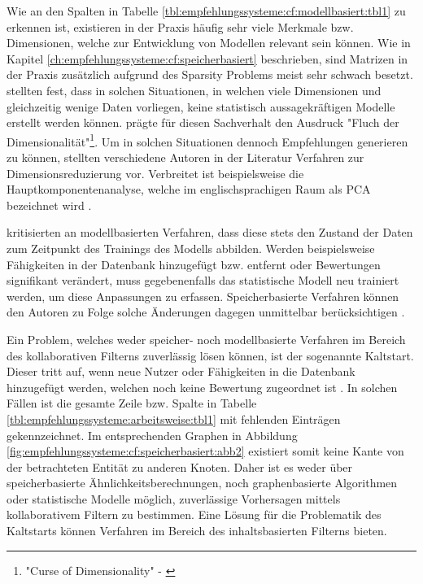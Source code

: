 Wie an den Spalten in Tabelle \ref{tbl:empfehlungssysteme:cf:modellbasiert:tbl1} zu erkennen ist, existieren in der Praxis häufig sehr viele Merkmale bzw. Dimensionen, welche zur Entwicklung von Modellen relevant sein können. Wie in Kapitel \ref{ch:empfehlungssysteme:cf:speicherbasiert} beschrieben, sind Matrizen in der Praxis zusätzlich aufgrund des Sparsity Problems meist sehr schwach besetzt. \textcite[S. 1]{boratto:2014} stellten fest, dass in solchen Situationen, in welchen viele Dimensionen und gleichzeitig wenige Daten vorliegen, keine statistisch aussagekräftigen Modelle erstellt werden können. \textcite[S. 94, Z. 7]{bellman:1961} prägte für diesen Sachverhalt den Ausdruck "Fluch der Dimensionalität"\footnote{"Curse of Dimensionality" - \textcite[S. 94, Z. 7]{bellman:1961}}. Um in solchen Situationen dennoch Empfehlungen generieren zu können, stellten verschiedene Autoren in der Literatur Verfahren zur Dimensionsreduzierung vor. Verbreitet ist beispielsweise die Hauptkomponentenanalyse, welche im englischsprachigen Raum als \ac{PCA} bezeichnet wird \cite[S. 1ff.]{vaswani:2018}.

\textcite[S. 1f.]{pennock:2000} kritisierten an modellbasierten Verfahren, dass diese stets den Zustand der Daten zum Zeitpunkt des Trainings des Modells abbilden. Werden beispielsweise Fähigkeiten in der Datenbank hinzugefügt bzw. entfernt oder Bewertungen signifikant verändert, muss gegebenenfalls das statistische Modell neu trainiert werden, um diese Anpassungen zu erfassen. Speicherbasierte Verfahren können den Autoren zu Folge solche Änderungen dagegen unmittelbar berücksichtigen \cite[S. 1f.]{pennock:2000}.

Ein Problem, welches weder speicher- noch modellbasierte Verfahren im Bereich des kollaborativen Filterns zuverlässig lösen können, ist der sogenannte Kaltstart. Dieser tritt auf, wenn neue Nutzer oder Fähigkeiten in die Datenbank hinzugefügt werden, welchen noch keine Bewertung zugeordnet ist \cite[S. 5]{huang:2004}. In solchen Fällen ist die gesamte Zeile bzw. Spalte in Tabelle \ref{tbl:empfehlungssysteme:arbeitsweise:tbl1} mit fehlenden Einträgen gekennzeichnet. Im entsprechenden Graphen in Abbildung \ref{fig:empfehlungssysteme:cf:speicherbasiert:abb2} existiert somit keine Kante von der betrachteten Entität zu anderen Knoten. Daher ist es weder über speicherbasierte Ähnlichkeitsberechnungen, noch graphenbasierte Algorithmen oder statistische Modelle möglich, zuverlässige Vorhersagen mittels kollaborativem Filtern zu bestimmen. Eine Lösung für die Problematik des Kaltstarts können Verfahren im Bereich des inhaltsbasierten Filterns bieten. %


